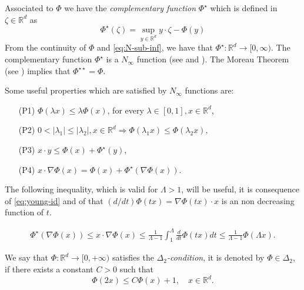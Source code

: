 \documentclass[twoside]{article}
\makeatletter
\theoremstyle{remark}
\def\namedlabel#1#2{\begingroup
    #2%
    \def\@currentlabel{#2}%
    \phantomsection\label{#1}\endgroup
}
\newcommand{\rr}{\mathbb{R}}
\renewcommand{\leq}{\leqslant}
\makeatother
\begin{document}
 



Associated to $\Phi$ we have the \emph{complementary function} $\Phi^{\star}$ which is defined in $\zeta\in\rr^d$ as
\begin{equation}\label{eq:conjugada}
 \Phi^{\star}(\zeta)=\sup\limits_{y\in\mathbb{R}^d} y\cdot \zeta-\Phi(y)
\end{equation}
From the continuity of $\Phi$ and  \eqref{eq:N-sub-inf}, we have that $\Phi^{\star}:\rr^d \to [0,\infty)$. 
The complementary function $\Phi^{\star}$ is a  $N_{\infty}$ function (see \cite[Chapter 2]{mawhin2010critical} and \cite[Th. 2.2]{Orliczvectorial2005}).  The Moreau Theorem (see \cite[Th. 4.21]{clarke2013functional}) implies that $\Phi^{\star\star}=\Phi$.

    
    
 Some useful properties which are satisfied by $N_{\infty}$ functions are:
 
 
\begin{enumerate}
 \item[\namedlabel{eq:escalar_ine}{(P1)}]   $\Phi(\lambda x)\leq \lambda\Phi(x)$, for every  $\lambda\in[0,1],x\in\rr^d$,
 \item[\namedlabel{eq:escalar_ine_2}{(P2)}] $ 0<|\lambda_1|\leq |\lambda_2|, x\in\rr^d \Rightarrow \Phi(\lambda_1 x)\leq\Phi(\lambda_2 x),$
  \item[\namedlabel{eq:young-ine}{(P3)}] $x\cdot y\leq \Phi(x)+\Phi^{\star}(y)$,
  \item[\namedlabel{eq:young-id}{(P4)}] $x\cdot \nabla\Phi(x)= \Phi(x)+\Phi^{\star}(\nabla \Phi (x))$.
 
 
\end{enumerate}




The following inequality, which is valid for $\Lambda>1$,  will be useful, it is consequence of \eqref{eq:young-id} and of that $(d/dt)\Phi(tx)=\nabla\Phi(tx)\cdot x$ is an non decreasing function of $t$.  


\begin{equation} \label{eq:ine-psi-phi'}
  \begin{split}
     \Phi^{\star}(\nabla \Phi (x))\leq  x\cdot \nabla\Phi(x) \leq\frac{1}{\Lambda-1}\int_1^{\Lambda} \frac{d}{dt}\Phi(tx)dt \leq\frac{1}{\Lambda-1}\Phi(\Lambda x). \end{split}
\end{equation}

We say that  $\Phi:\mathbb{R}^d\rightarrow [0,+\infty)$ satisfies the  \emph{$\Delta_2$-condition}, it is denoted by $\Phi \in \Delta_2$,
if there exists a  constant $C>0$  such that
\begin{equation}\label{delta2defi}\Phi(2x)\leq C \Phi(x)+1,\quad x\in\rr^d.
\end{equation}
\end{document}
